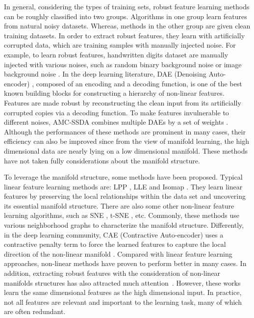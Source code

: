 \documentclass{article}
\begin{document}
In general, considering the types of training sets, robust feature learning methods can be roughly classified into two groups. Algorithms in one group learn features from natural noisy datasets. Whereas, methods in the other group are given clean training datasets.  In order to extract robust features, they learn with artificially corrupted data, which are training samples with manually injected noise.  For example, to learn robust features, handwritten digits dataset are manually injected with various noises, such as random binary background noise or image background noise \cite{larochelle2007empirical}.  In the deep learning literature, DAE (Denoising Auto-encoder) \cite{VincentLLBM10}, composed of an encoding and a decoding function,  is one of the best known building blocks for constructing a hierarchy of non-linear features. Features are made robust by reconstructing the clean input from its artificially corrupted copies via a decoding function. To make features invulnerable to different noises, AMC-SSDA combines multiple DAEs by a set of weights \cite{agostinelli2013adaptive}. Although the performances of these methods are prominent in many cases, their efficiency can also be improved since from the view of manifold learning, the high dimensional data are nearly lying on a low dimensional manifold. These methods have not taken fully considerations about the manifold structure.

To leverage the manifold structure,  some methods have been proposed. Typical linear feature learning methods are: LPP \cite{niyogi2004locality}, LLE \cite{roweis2000nonlinear} and Isomap \cite{tenenbaum2000global}. They learn linear features by preserving the local relationships within the data set and uncovering its essential manifold structure. There are also some other non-linear feature learning algorithms, such as SNE \cite{hinton2002stochastic}, t-SNE \cite{maaten2009learning}, etc. Commonly, these methods use various neighborhood graphs to characterize the manifold structure.  Differently, in the deep learning community, CAE (Contractive Auto-encoder) uses a contractive penalty term to force the learned features to capture the local direction of the non-linear manifold \cite{DBLP:conf/icml/RifaiVMGB11}. Compared with linear feature learning approaches, non-linear methods have proven to perform better in many cases. In addition, extracting robust features with the consideration of non-linear manifolds structures has also attracted much attention~\cite{DBLP:conf/nips/HeinM06,DBLP:conf/cvpr/WangT13}. However, these works learn the same dimensional features as the high dimensional input. In practice, not all features are relevant and important to the learning task, many of which are often redundant.
\end{document}
